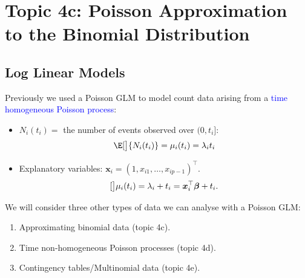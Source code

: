 \documentclass{article}\usepackage[]{graphicx}\usepackage[svgnames]{xcolor}
\let\log\relax%
\providecommand{\Vector}[1]{\bm{#1}}%
\begin{document}
\section*{Topic 4c: Poisson Approximation to the Binomial Distribution}
\subsection*{Log Linear Models}
Previously we used a Poisson GLM to model count data arising from a \textcolor{Blue}{time
    homogeneous Poisson process}:
\begin{itemize}
    \item $ N_i(t_i)= $ the number of events observed over $ (0,t_i] $:
          \[ \E[\big]{N_i(t_i)}=\mu_i(t_i)=\lambda_i t_i \]
    \item Explanatory variables: $ \Vector{x}_i=(1,x_{i1},\ldots,x_{ip-1})^\top $.
          \[ \log[\big]{\mu_i(t_i)}=\log{\lambda_i}+\log{t_i}=\Vector{x}_i^\top \Vector{\beta}+\log{t_i}. \]
\end{itemize}
We will consider three other types of data we can analyse with a Poisson GLM:
\begin{enumerate}[1.]
    \item Approximating binomial data (topic 4c).
    \item Time non-homogeneous Poisson processes (topic 4d).
    \item Contingency tables/Multinomial data (topic 4e).
\end{enumerate}
\end{document}
